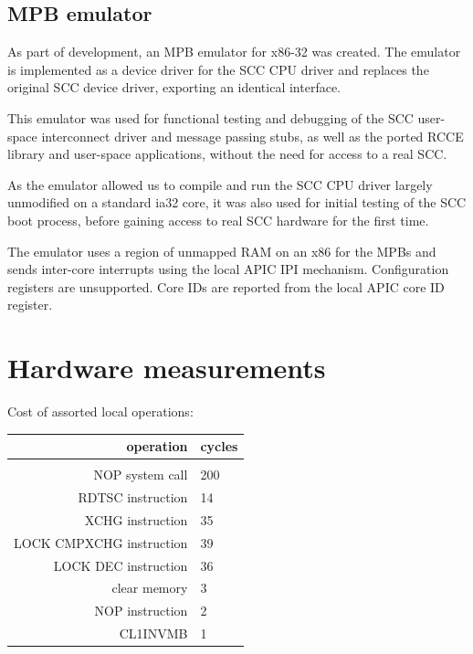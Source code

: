 \documentclass[a4paper,twoside]{report} %
\begin{document}
\section{MPB emulator}

As part of development, an MPB emulator for x86-32 was created.
The emulator is implemented as a device driver for the SCC CPU 
driver and replaces the original SCC device driver, exporting an
identical interface.

This emulator was used for functional testing and debugging of the SCC
user-space interconnect driver and message passing stubs, as well as
the ported RCCE library and user-space applications, without the
need for access to a real SCC.   

As the emulator allowed us to compile and run the SCC CPU driver
largely unmodified on a standard ia32 core, it was also used for
initial testing of the SCC boot process, before gaining access to real
SCC hardware for the first time.

The emulator uses a region of unmapped RAM on an x86 for the
MPBs and sends inter-core interrupts using the local APIC IPI
mechanism. Configuration registers are unsupported. Core IDs are
reported from the local APIC core ID register.

\chapter{Hardware measurements}\label{chap:bench}

Cost of assorted local operations: 

\begin{center}
\begin{tabular}{rl}
operation & cycles \\
\hline \\
NOP system call & 200 \\
RDTSC instruction & 14 \\
XCHG instruction & 35 \\
LOCK CMPXCHG instruction & 39 \\
LOCK DEC instruction & 36 \\
clear memory & 3 \\
NOP instruction & 2 \\
CL1INVMB & 1 \\
\end{tabular}
\end{center}
\end{document}
